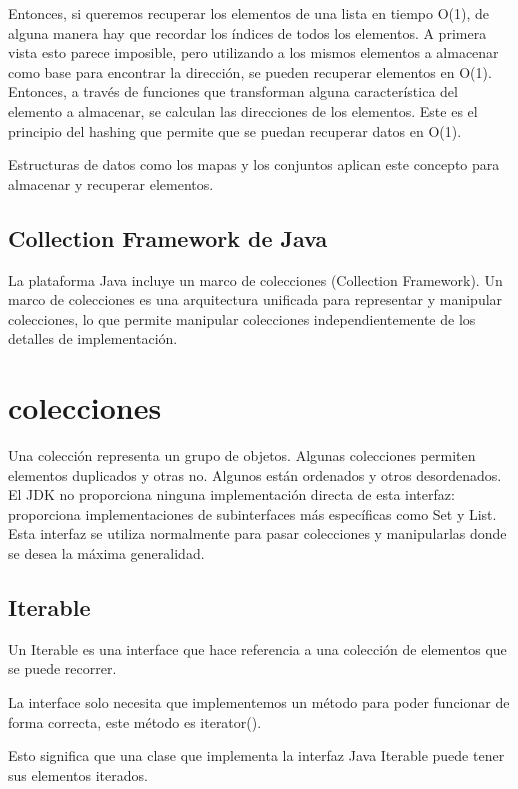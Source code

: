 \documentclass[11pt]{article}
\begin{document}
\par
Entonces, si queremos recuperar los elementos de una lista en tiempo 
O(1), de alguna manera hay que recordar los índices de todos los 
elementos. A primera vista esto parece imposible, pero utilizando a 
los mismos elementos a almacenar como base para encontrar la 
dirección, se pueden recuperar elementos en O(1). Entonces, a través 
de funciones que transforman alguna característica del elemento a 
almacenar, se calculan las direcciones de los elementos. Este es el 
principio del hashing que permite que se puedan recuperar datos en 
O(1). 
\par
Estructuras de datos como los mapas y los conjuntos aplican este 
concepto para almacenar y recuperar elementos. 

\subsection{Collection Framework de Java}
\par
La plataforma Java incluye un marco de colecciones (Collection 
Framework). Un marco de colecciones es una arquitectura unificada 
para representar y manipular colecciones, lo que permite manipular 
colecciones independientemente de los detalles de implementación. 

\section{colecciones}
\par
Una colección representa un grupo de objetos. Algunas colecciones 
permiten elementos duplicados y otras no. Algunos están ordenados y 
otros desordenados. El JDK no proporciona ninguna implementación 
directa de esta interfaz: proporciona implementaciones de 
subinterfaces más específicas como Set y List. Esta interfaz se 
utiliza normalmente para pasar colecciones y manipularlas donde se 
desea la máxima generalidad.

\subsection{Iterable}
\par
Un Iterable es una interface que hace referencia a una colección de 
elementos que se puede recorrer.
\par
La interface solo necesita que implementemos un método para poder 
funcionar de forma correcta, este método es iterator().
\par
Esto significa que una clase que implementa la interfaz Java Iterable 
puede tener sus elementos iterados. 
\end{document}

